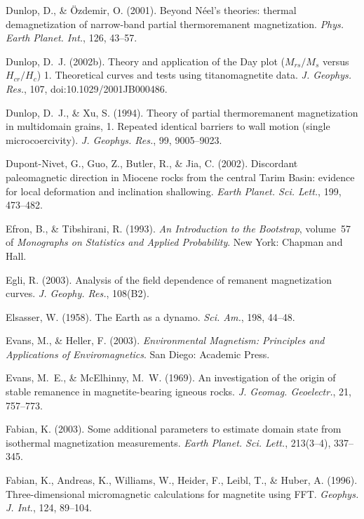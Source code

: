 \documentclass[,plain]{tauxe}
\begin{document}
\begin{thebibliography}{}
\bibitem{}%
Dunlop, D., \& \"Ozdemir, O. (2001).
Beyond N\'eel's theories: thermal demagnetization of narrow-band partial thermoremanent magnetization.
{\it Phys. Earth Planet. Int.}, 126, 43--57.

\bibitem{}%
Dunlop, D.~J. (2002b).
Theory and application of the Day plot ($M_{rs}/M_s$ versus $H_{cr}/H_c$) 1. Theoretical curves and tests using titanomagnetite data.
{\it J. Geophys. Res.}, 107, doi:10.1029/2001JB000486.

\bibitem{}%
Dunlop, D.~J., \& Xu, S. (1994).
Theory of partial thermoremanent magnetization in multidomain grains, 1. Repeated identical barriers to wall motion (single microcoercivity).
{\it J. Geophys. Res.}, 99, 9005--9023.

\bibitem{}%
Dupont-Nivet, G., Guo, Z., Butler, R., \& Jia, C. (2002).
Discordant paleomagnetic direction in Miocene rocks from the central Tarim Basin: evidence for local deformation and inclination shallowing.
{\it Earth Planet. Sci. Lett.}, 199, 473--482.

\bibitem{}%
Efron, B., \& Tibshirani, R. (1993).
{\it An Introduction to the Bootstrap}, volume~57 of {\it Monographs on Statistics and Applied Probability}.
New York: Chapman and Hall.

\bibitem{}%
Egli, R. (2003).
Analysis of the field dependence of remanent magnetization curves.
{\it J. Geophy. Res.}, 108(B2).

\bibitem{}%
Elsasser, W. (1958).
The Earth as a dynamo.
{\it Sci. Am.}, 198, 44--48.



\bibitem{}%
Evans, M., \& Heller, F. (2003). {\it Environmental Magnetism:
Principles and Applications of Enviromagnetics}. San Diego:
Academic Press.

\bibitem{}%
Evans, M.~E., \& McElhinny, M.~W. (1969).
An investigation of the origin of stable remanence in magnetite-bearing igneous rocks.
{\it J. Geomag. Geoelectr.}, 21, 757--773.

\bibitem{}%
Fabian, K. (2003).
Some additional parameters to estimate domain state from isothermal magnetization measurements.
{\it Earth Planet. Sci. Lett.}, 213(3--4), 337--345.

\bibitem{}%
Fabian, K., Andreas, K., Williams, W., Heider, F., Leibl, T., \& Huber, A. (1996).
Three-dimensional micromagnetic calculations for magnetite using FFT.
{\it Geophys. J. Int.}, 124, 89--104.


\end{thebibliography}
\end{document}
